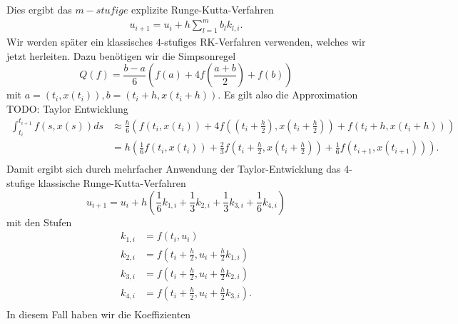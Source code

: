 Dies ergibt das $m-stufige$ explizite Runge-Kutta-Verfahren
\begin{align}
    u_{i+1} = u_i + h \sum_{l=1}^{m} b_l k_{l,i}.   \label{exp-rk-def}
\end{align}
Wir werden später ein klassisches $4$-stufiges RK-Verfahren verwenden, welches wir jetzt herleiten.
Dazu benötigen wir die Simpsonregel
\[
    Q(f) = \frac{b-a}{6} (f(a) + 4f(\frac{a+b}{2}) +f(b))
\]
mit $a=(t_i,x(t_i)), b=(t_{i}+h,x(t_{i}+h))$. Es gilt also die Approximation
TODO: Taylor Entwicklung
\begin{align*}
    \int_{t_i}^{t_{i+1}} f(s,x(s)) ds &\approx
    \frac{h}{6}(f(t_i,x(t_i)) + 4f((t_i + \frac{h}{2}), x(t_i+\frac{h}{2})) + f(t_i + h,x(t_i + h))) \\
    &= h\left(\frac{1}{6}f(t_i,x(t_i)) + \frac{2}{3}f\left( t_i + \frac{h}{2}, x\left( t_i + \frac{h}{2}\right) \right)
    + \frac{1}{6}f(t_{i+1},x(t_{i+1}))\right). \\
\end{align*}
Damit ergibt sich durch mehrfacher Anwendung der Taylor-Entwicklung das 4-stufige klassische Runge-Kutta-Verfahren
\[
    u_{i+1} = u_i + h\left( \frac{1}{6}k_{1,i} + \frac{1}{3} k_{2,i} + \frac{1}{3} k_{3,i} + \frac{1}{6} k_{4,i} \right)
\]
mit den Stufen
\begin{align*}
    k_{1,i} &= f(t_i,u_i) \\
    k_{2,i} &= f(t_i + \frac{h}{2}, u_i + \frac{h}{2}k_{1,i}) \\
    k_{3,i} &= f(t_i + \frac{h}{2}, u_i + \frac{h}{2}k_{2,i}) \\
    k_{4,i} &= f(t_i + \frac{h}{2}, u_i + \frac{h}{2}k_{3,i}). \\
\end{align*}
In diesem Fall haben wir die Koeffizienten
